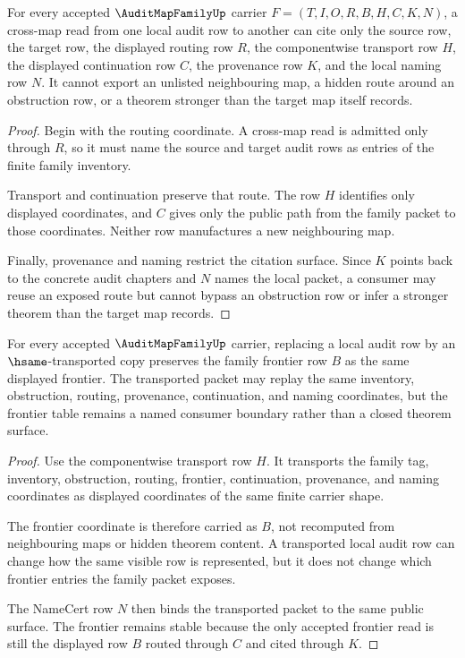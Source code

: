 \begin{theorem}
\label{thm:audit-map-family-cross-map-nonescape}
For every accepted $\AuditMapFamilyUp$ carrier $F=(T,I,O,R,B,H,C,K,N)$, a cross-map read from one local audit row to another can cite only the source row, the target row, the displayed routing row $R$, the componentwise transport row $H$, the displayed continuation row $C$, the provenance row $K$, and the local naming row $N$. It cannot export an unlisted neighbouring map, a hidden route around an obstruction row, or a theorem stronger than the target map itself records.
\end{theorem}
\begin{proof}
Begin with the routing coordinate. A cross-map read is admitted only through $R$, so it must name the source and target audit rows as entries of the finite family inventory.

Transport and continuation preserve that route. The row $H$ identifies only displayed coordinates, and $C$ gives only the public path from the family packet to those coordinates. Neither row manufactures a new neighbouring map.

Finally, provenance and naming restrict the citation surface. Since $K$ points back to the concrete audit chapters and $N$ names the local packet, a consumer may reuse an exposed route but cannot bypass an obstruction row or infer a stronger theorem than the target map records.
\end{proof}

\begin{theorem}
\label{thm:audit-map-family-frontier-stability}
For every accepted $\AuditMapFamilyUp$ carrier, replacing a local audit row by an $\hsame$-transported copy preserves the family frontier row $B$ as the same displayed frontier. The transported packet may replay the same inventory, obstruction, routing, provenance, continuation, and naming coordinates, but the frontier table remains a named consumer boundary rather than a closed theorem surface.
\end{theorem}
\begin{proof}
Use the componentwise transport row $H$. It transports the family tag, inventory, obstruction, routing, frontier, continuation, provenance, and naming coordinates as displayed coordinates of the same finite carrier shape.

The frontier coordinate is therefore carried as $B$, not recomputed from neighbouring maps or hidden theorem content. A transported local audit row can change how the same visible row is represented, but it does not change which frontier entries the family packet exposes.

The NameCert row $N$ then binds the transported packet to the same public surface. The frontier remains stable because the only accepted frontier read is still the displayed row $B$ routed through $C$ and cited through $K$.
\end{proof}

